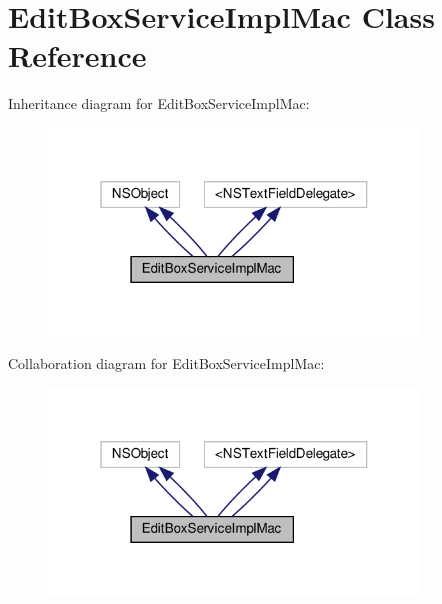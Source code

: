 \hypertarget{interfaceEditBoxServiceImplMac}{}\section{Edit\+Box\+Service\+Impl\+Mac Class Reference}
\label{interfaceEditBoxServiceImplMac}


Inheritance diagram for Edit\+Box\+Service\+Impl\+Mac\+:
\nopagebreak
\begin{figure}[H]
\begin{center}
\leavevmode
\includegraphics[width=280pt]{interfaceEditBoxServiceImplMac__inherit__graph}
\end{center}
\end{figure}


Collaboration diagram for Edit\+Box\+Service\+Impl\+Mac\+:
\nopagebreak
\begin{figure}[H]
\begin{center}
\leavevmode
\includegraphics[width=280pt]{interfaceEditBoxServiceImplMac__coll__graph}
\end{center}
\end{figure}
